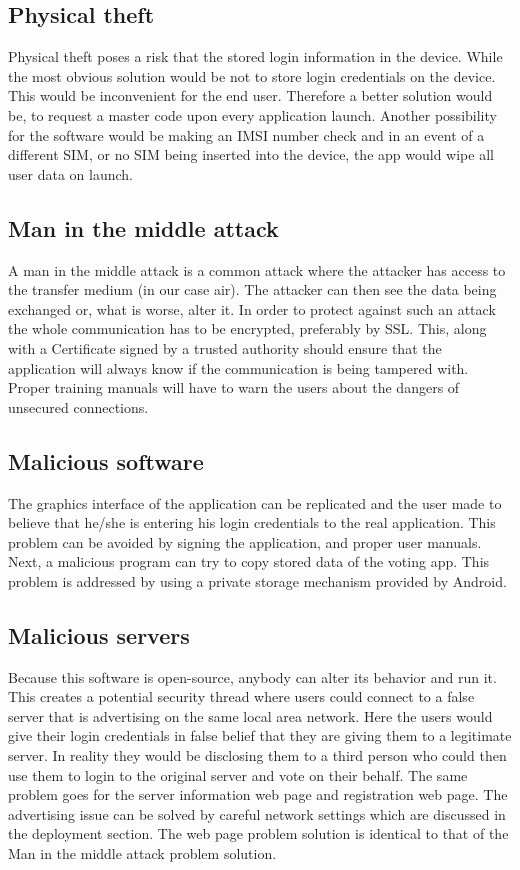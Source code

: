 \documentclass[11pt,twoside,a4paper]{book}
\begin{document}
\subsection{Physical theft}
Physical theft poses a risk that the stored login information in the device. While the most obvious solution would be not to store login credentials on the device. This would be inconvenient for the end user. Therefore a better solution would be, to request a master code upon every application launch. Another possibility for the software would be making an IMSI number check and in an event of a different SIM, or no SIM being inserted into the device, the app would wipe all user data on launch. 
\subsection{Man in the middle attack}
A man in the middle attack is a common attack where the attacker has access to the transfer medium (in our case air). The attacker can then see the data being exchanged or, what is worse, alter it. In order to protect against such an attack the whole communication has to be encrypted, preferably by SSL. This, along with a Certificate signed by a trusted authority should ensure that the application will always know if the communication is being tampered with. Proper training manuals will have to warn the users about the dangers of unsecured connections.
\subsection{Malicious software}
The graphics interface of the application can be replicated and the user made to believe that he/she is entering his login credentials to the real application. This problem can be avoided by signing the application, and proper user manuals.\\
Next, a malicious program can try to copy stored data of the voting app. This problem is addressed by using a private storage mechanism provided by Android. \cite{storageAnd}
\subsection{Malicious servers}
Because this software is open-source, anybody can alter its behavior and run it. This creates a potential security thread where users could connect to a false server that is advertising on the same local area network. Here the users would give their login credentials in false belief that they are giving them to a legitimate server. In reality they would be disclosing them to a third person who could then use them to login to the original server and vote on their behalf. The same problem goes for the server information web page and registration web page. The advertising issue can be solved by careful network settings which are discussed in the deployment section. The web page problem solution is identical to that of the Man in the middle attack problem solution.
\end{document}
